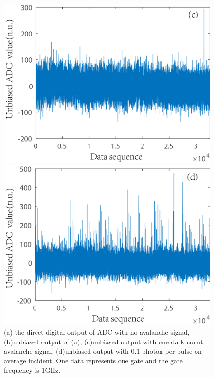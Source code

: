 \documentclass[%
 reprint,
superscriptaddress,
 amsmath,amssymb,
 aps,
]{revtex4-1}
\begin{document}
\begin{figure}
\begin{minipage}{0.45\linewidth}
\centering
\includegraphics[width = 1\textwidth]{figure/1-count.jpg}%
\end{minipage}
\begin{minipage}{0.45\linewidth}
\centering
\includegraphics[width = 1\textwidth]{figure/10percent.jpg}%
\end{minipage}
\vskip -0.1in
\caption{\label{fig:ADC_output}(a) the direct digital output of ADC with no avalanche signal, (b)unbiased output of (a), (c)unbiased output with one dark count avalanche signal, (d)unbiased output with 0.1 photon per pulse on average incident. One data represents one gate and the gate frequency is 1GHz.}
\vskip -0.2in
\end{figure}
\end{document}
